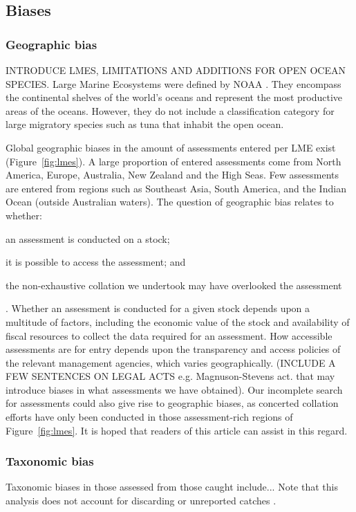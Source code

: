 \documentclass[letterpaper,12pt]{article}
\begin{document}
\subsection{Biases}
\subsubsection{Geographic bias}
INTRODUCE LMES, LIMITATIONS AND ADDITIONS FOR OPEN OCEAN SPECIES.
Large Marine Ecosystems were defined by NOAA  \citep{NOAA:LME64:1998}. They encompass the continental shelves of the world's oceans and represent the most productive areas of the oceans. However, they do not include a classification category for large migratory species such as tuna that inhabit the open ocean. 


Global geographic biases in the amount of assessments entered per LME exist (Figure~\ref{fig:lmes}). A large proportion of entered assessments come from North America, Europe, Australia, New Zealand and the High Seas. Few assessments are entered from regions such as Southeast Asia, South America, and the Indian Ocean (outside Australian waters). The question of geographic bias relates to whether: \begin{inparaenum}[1\upshape)] \item an assessment is conducted on a stock; \item it is possible to access the assessment; and \item the non-exhaustive collation we undertook may have overlooked the assessment \end{inparaenum}. Whether an assessment is conducted for a given stock depends upon a multitude of factors, including the economic value of the stock and availability of fiscal resources to collect the data required for an assessment. How accessible assessments are for entry depends upon the transparency and access policies of the relevant management agencies, which varies geographically. (INCLUDE A FEW SENTENCES ON LEGAL ACTS e.g. Magnuson-Stevens act. that may introduce biases in what assessments we have obtained). Our incomplete search for assessments could also give rise to geographic biases, as concerted collation efforts have only been conducted in those assessment-rich regions of Figure~\ref{fig:lmes}. It is hoped that readers of this article can assist in this regard.

\subsubsection{Taxonomic bias}
Taxonomic biases in those assessed from those caught include...
Note that this analysis does not account for discarding or unreported catches \citep{Pauly:etal:2002:nature, Pitcher:etal:2002:fnf}.
\end{document}
